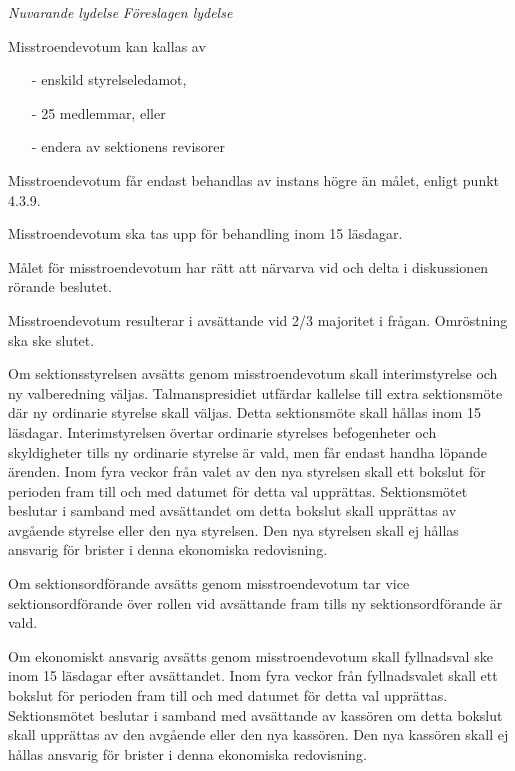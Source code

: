 \documentclass{article}
\newenvironment{lydelse}
    {\begin{paracol}{2}%
        \emph{Nuvarande lydelse}%
        \switchcolumn%
        \emph{Föreslagen lydelse}%
    \end{paracol}%
    \begin{enumerate}[label=\thesubsection.\arabic*]%
    \begin{paracol}{2}%
    }{\end{paracol}\end{enumerate}}
\begin{document}
\begin{lydelse}
    \setcounter{subsection}{3}
    \item Misstroendevotum kan kallas av
		  \begin{itemize}
			  \item[-] enskild styrelseledamot, 
  			\item[-] 25 medlemmar, eller
  			\item[-] endera av sektionens revisorer
  		\end{itemize}
	
	  \item Misstroendevotum får endast behandlas av instans högre än målet, enligt punkt 4.3.9.

  	\item Misstroendevotum ska tas upp för behandling inom 15 läsdagar.

  	\item Målet för misstroendevotum har rätt att närvarva vid och delta i diskussionen rörande beslutet.

  	\item Misstroendevotum resulterar i avsättande vid 2/3 majoritet i frågan. Omröstning ska ske slutet. 

  	\item Om sektionsstyrelsen avsätts genom misstroendevotum skall interimstyrelse och ny valberedning väljas. Talmanspresidiet utfärdar kallelse till extra sektionsmöte där ny ordinarie styrelse skall väljas. Detta sektionsmöte skall hållas inom 15 läsdagar. Interimstyrelsen övertar ordinarie styrelses befogenheter och skyldigheter tills ny ordinarie styrelse är vald, men får endast handha löpande ärenden. Inom fyra veckor från valet av den nya styrelsen skall ett bokslut för perioden fram till och med datumet för detta val upprättas. Sektionsmötet beslutar i samband med avsättandet om detta bokslut skall upprättas av avgående styrelse eller den nya styrelsen. Den nya styrelsen skall ej hållas ansvarig för brister i denna ekonomiska redovisning.

  	\item Om sektionsordförande avsätts genom misstroendevotum tar vice sektionsordförande över rollen vid avsättande fram tills ny sektionsordförande är vald.

  	\item Om ekonomiskt ansvarig avsätts genom misstroendevotum skall fyllnadsval ske inom 15 läsdagar efter avsättandet. Inom fyra veckor från fyllnadsvalet skall ett bokslut för perioden fram till och med datumet för detta val upprättas. Sektionsmötet beslutar i samband med avsättande av kassören om detta bokslut skall upprättas av den avgående eller den nya kassören. Den nya kassören skall ej hållas  ansvarig för brister i denna ekonomiska redovisning. 


\end{lydelse}
\end{document}
